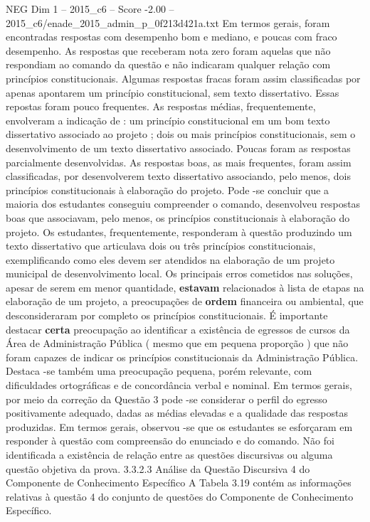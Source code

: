 \begin{textsample}{NEG Dim 1 – 2015\_c6 – Score -2.00 – 2015\_c6/enade\_2015\_admin\_p\_0f213d421a.txt}
Em termos gerais, foram encontradas respostas com desempenho bom e mediano, e poucas com fraco desempenho.
As respostas que receberam nota zero foram aquelas que não respondiam ao comando da questão e não indicaram qualquer relação com princípios constitucionais.
Algumas respostas fracas foram assim classificadas por apenas apontarem um princípio constitucional, sem texto dissertativo.
Essas repostas foram pouco frequentes.
As respostas médias, frequentemente, envolveram a indicação de : um princípio constitucional em um bom texto dissertativo associado ao projeto ; dois ou mais princípios constitucionais, sem o desenvolvimento de um texto dissertativo associado.
Poucas foram as respostas parcialmente desenvolvidas.
As respostas boas, as mais frequentes, foram assim classificadas, por desenvolverem texto dissertativo associando, pelo menos, dois princípios constitucionais à elaboração do projeto.
Pode -se concluir que a maioria dos estudantes conseguiu compreender o comando, desenvolveu respostas boas que associavam, pelo menos, os princípios constitucionais à elaboração do projeto.
Os estudantes, frequentemente, responderam à questão produzindo um texto dissertativo que articulava dois ou três princípios constitucionais, exemplificando como eles devem ser atendidos na elaboração de um projeto municipal de desenvolvimento local.
Os principais erros cometidos nas soluções, apesar de serem em menor quantidade, \textbf{estavam} relacionados à lista de etapas na elaboração de um projeto, a preocupações de \textbf{ordem} financeira ou ambiental, que desconsideraram por completo os princípios constitucionais.
É importante destacar \textbf{certa} preocupação ao identificar a existência de egressos de cursos da Área de Administração Pública ( mesmo que em pequena proporção ) que não foram capazes de indicar os princípios constitucionais da Administração Pública.
Destaca -se também uma preocupação pequena, porém relevante, com dificuldades ortográficas e de concordância verbal e nominal.
Em termos gerais, por meio da correção da Questão 3 pode -se considerar o perfil do egresso positivamente adequado, dadas as médias elevadas e a qualidade das respostas produzidas.
Em termos gerais, observou -se que os estudantes se esforçaram em responder à questão com compreensão do enunciado e do comando.
Não foi identificada a existência de relação entre as questões discursivas ou alguma questão objetiva da prova. 3.3.2.3 Análise da Questão Discursiva 4 do Componente de Conhecimento Específico A Tabela 3.19 contém as informações relativas à questão 4 do conjunto de questões do Componente de Conhecimento Específico.

\end{textsample}
